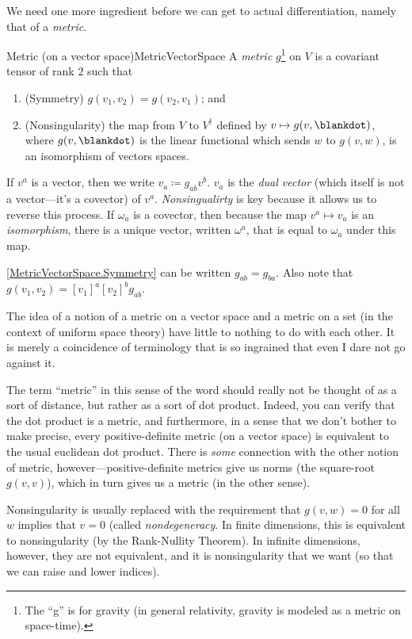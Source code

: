 We need one more ingredient before we can get to actual differentiation, namely that of a \emph{metric}.
\begin{dfn}{Metric (on a vector space)}{MetricVectorSpace}
A \emph{metric} $g$\footnote{The ``g'' is for gravity (in general relativity, gravity is modeled as a metric on space-time).} on $V$ is a covariant tensor of rank $2$ such that
\begin{enumerate}
\item \label{MetricVectorSpace.Symmetry}(Symmetry) $g(v_1,v_2)=g(v_2,v_1)$; and
\item \label{MetricVectorSpace.Nonsingularity}(Nonsingularity) the map from $V$ to $V^{\dagger}$ defined by $v\mapsto g(v,\blankdot )$, where $g(v,\blankdot )$ is the linear functional which sends $w$ to $g(v,w)$, is an isomorphism of vectors spaces.
\end{enumerate}
\begin{rmk}
If $v^a$ is a vector, then we write $v_a\coloneqq g_{ab}v^b$.  $v_a$ is the \emph{dual vector} (which itself is not a vector---it's a covector) of $v^a$.  \emph{Nonsingualirty} is key because it allows us to reverse this process.  If $\omega _a$ is a covector, then because the map $v^a\mapsto v_a$ is an \emph{isomorphism}, there is a unique vector, written $\omega ^a$, that is equal to $\omega _a$ under this map.
\end{rmk}
\begin{rmk}
\cref{MetricVectorSpace.Symmetry} can be written $g_{ab}=g_{ba}$.  Also note that $g(v_1,v_2)=[v_1]^a[v_2]^bg_{ab}$.
\end{rmk}
\begin{rmk}
The idea of a notion of a metric on a vector space and a metric on a set (in the context of uniform space theory) have little to nothing to do with each other.  It is merely a coincidence of terminology that is so ingrained that even I dare not go against it.
\end{rmk}
\begin{rmk}
The term ``metric'' in this sense of the word should really not be thought of as a sort of distance, but rather as a sort of dot product.  Indeed, you can verify that the dot product is a metric, and furthermore, in a sense that we don't bother to make precise, every positive-definite metric (on a vector space) is equivalent to the usual euclidean dot product.  There is \emph{some} connection with the other notion of metric, however---positive-definite metrics give us norms (the square-root $g(v,v)$), which in turn gives us a metric (in the other sense).
\end{rmk}
\begin{rmk}
Nonsingularity is usually replaced with the requirement that $g(v,w)=0$ for all $w$ implies that $v=0$ (called \emph{nondegeneracy}.  In finite dimensions, this is equivalent to nonsingularity (by the Rank-Nullity Theorem).  In infinite dimensions, however, they are not equivalent, and it is nonsingularity that we want (so that we can raise and lower indices).
\end{rmk}
\end{dfn}

